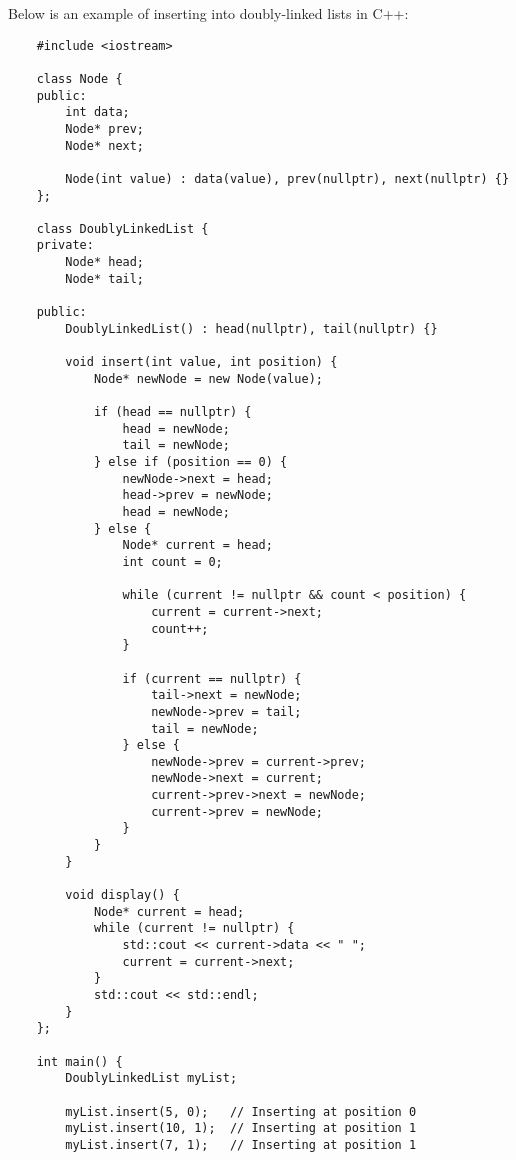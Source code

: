 \begin{solution}
    Below is an example of inserting into doubly-linked lists in C++:

    \horizontalline

    \begin{verbatim}
    #include <iostream>

    class Node {
    public:
        int data;
        Node* prev;
        Node* next;
    
        Node(int value) : data(value), prev(nullptr), next(nullptr) {}
    };
    
    class DoublyLinkedList {
    private:
        Node* head;
        Node* tail;
    
    public:
        DoublyLinkedList() : head(nullptr), tail(nullptr) {}
    
        void insert(int value, int position) {
            Node* newNode = new Node(value);
    
            if (head == nullptr) {
                head = newNode;
                tail = newNode;
            } else if (position == 0) {
                newNode->next = head;
                head->prev = newNode;
                head = newNode;
            } else {
                Node* current = head;
                int count = 0;
    
                while (current != nullptr && count < position) {
                    current = current->next;
                    count++;
                }
    
                if (current == nullptr) {
                    tail->next = newNode;
                    newNode->prev = tail;
                    tail = newNode;
                } else {
                    newNode->prev = current->prev;
                    newNode->next = current;
                    current->prev->next = newNode;
                    current->prev = newNode;
                }
            }
        }
    
        void display() {
            Node* current = head;
            while (current != nullptr) {
                std::cout << current->data << " ";
                current = current->next;
            }
            std::cout << std::endl;
        }
    };
    
    int main() {
        DoublyLinkedList myList;
    
        myList.insert(5, 0);   // Inserting at position 0
        myList.insert(10, 1);  // Inserting at position 1
        myList.insert(7, 1);   // Inserting at position 1
    

\end{verbatim}
\end{solution}
